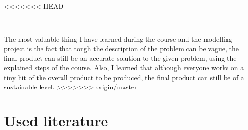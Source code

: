 \documentclass[a4paper, 11pt, notitlepage]{report}
\begin{document}
<<<<<<< HEAD


{}

=======


The most valuable thing I have learned during the course and the modelling project is the fact that tough the description of the problem can be vague, the final product can still be an accurate solution to the given problem, using the explained steps of the course. Also, I learned that although everyone works on a tiny bit of the overall product to be produced, the final product can still be of a sustainable level.
>>>>>>> origin/master

\chapter{Used literature}
\end{document}
